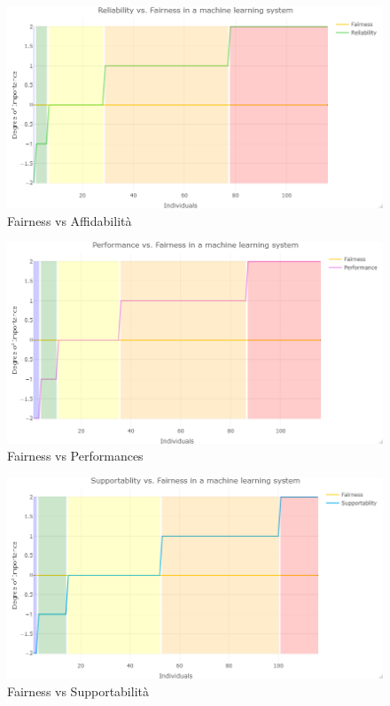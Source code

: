     \begin{figure}[h!]
        \centering
        \includegraphics[width=1\textwidth]{figure/Analisi/RQ3/2.Reliability_vs_Fairness.png}
        \caption{Fairness vs Affidabilità}
    \end{figure}
    
    \begin{figure}[h!]
        \centering
        \includegraphics[width=1\textwidth]{figure/Analisi/RQ3/3.Performance vs. Fairness.png}
        \caption{Fairness vs Performances}
    \end{figure}
    
    
    \begin{figure}[h!]
        \centering
        \includegraphics[width=1\textwidth]{figure/Analisi/RQ3/4.Supportablity vs. Fairness.png}
        \caption{Fairness vs Supportabilità}
    \end{figure}
    

